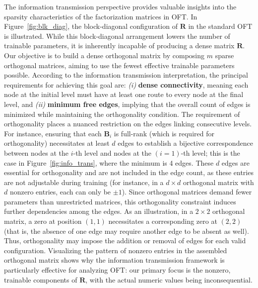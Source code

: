 The information transmission perspective provides valuable insights into the sparsity characteristics of the factorization matrices in OFT. In Figure~\ref{fig:blk_diag}, the block-diagonal configuration of $\bm{R}$ in the standard OFT is illustrated. While this block-diagonal arrangement lowers the number of trainable parameters, it is inherently incapable of producing a dense matrix $\bm{R}$. Our objective is to build a dense orthogonal matrix by composing $m$ sparse orthogonal matrices, aiming to use the fewest effective trainable parameters possible. According to the information transmission interpretation, the principal requirements for achieving this goal are: \emph{(i)} \textbf{dense connectivity}, meaning each node at the initial level must have at least one route to every node at the final level, and \emph{(ii)} \textbf{minimum free edges}, implying that the overall count of edges is minimized while maintaining the orthogonality condition. The requirement of orthogonality places a nuanced restriction on the edges linking consecutive levels. For instance, ensuring that each $\bm{B}_i$ is full-rank (which is required for orthogonality) necessitates at least $d$ edges to establish a bijective correspondence between nodes at the $i$-th level and nodes at the $(i=1)$-th level; this is the case in Figure~\ref{fig:info_trans}, where the minimum is 4 edges. These $d$ edges are essential for orthogonality and are not included in the edge count, as these entries are not adjustable during training (for instance, in a $d\times d$ orthogonal matrix with $d$ nonzero entries, each can only be $\pm 1$). Since orthogonal matrices demand fewer parameters than unrestricted matrices, this orthogonality constraint induces further dependencies among the edges. As an illustration, in a $2\times 2$ orthogonal matrix, a zero at position $(1,1)$ necessitates a corresponding zero at $(2,2)$ (that is, the absence of one edge may require another edge to be absent as well). Thus, orthogonality may impose the addition or removal of edges for each valid configuration. Visualizing the pattern of nonzero entries in the assembled orthogonal matrix shows why the information transmission framework is particularly effective for analyzing OFT: our primary focus is the nonzero, trainable components of $\bm{R}$, with the actual numeric values being inconsequential.

